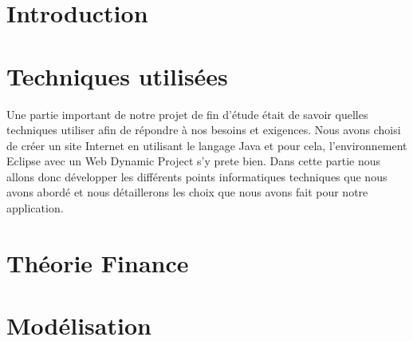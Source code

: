 \documentclass{report}
\begin{document}
\setcounter{page}{1}
\tableofcontents{}
\chapter{Introduction}
	


\chapter{Techniques utilisées}
Une partie important de notre projet de fin d'étude était de savoir quelles techniques utiliser afin de répondre à nos besoins et exigences. Nous avons choisi de créer un site Internet en utilisant le langage Java et pour cela, l'environnement Eclipse avec un Web Dynamic Project s'y prete bien.
Dans cette partie nous allons donc développer les différents points informatiques techniques que nous avons abordé et nous détaillerons les choix que nous avons fait pour notre application.
	
	
	
	
	
	
	
	
	
	
	
	
	
\chapter{Théorie Finance}
	
	
	
	
	
	
	
	
	
\chapter{Modélisation}
	
	
	
	
	
	
	
	
	
	
	
	
\end{document}
